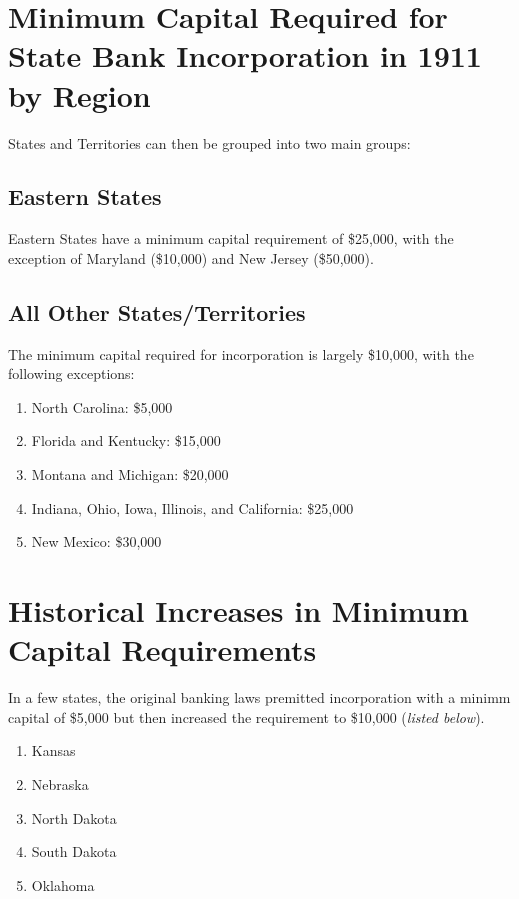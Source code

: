 ﻿\documentclass[12pt]{report}
\begin{document}
\chapter{Minimum Capital Required for State Bank Incorporation in 1911 by Region}

States and Territories can then be grouped into two main groups:\\

\section{Eastern States}
Eastern States have a minimum capital requirement of \$25,000, with the exception of Maryland (\$10,000) and New Jersey (\$50,000).

\section{All Other States/Territories}
The minimum capital required for incorporation is largely \$10,000, with the following exceptions:

\begin{enumerate}
\item North Carolina: \$5,000
\item Florida and Kentucky: \$15,000
\item Montana and Michigan: \$20,000
\item Indiana, Ohio, Iowa, Illinois, and California: \$25,000
\item New Mexico: \$30,000
\end{enumerate}



\chapter{Historical Increases in Minimum Capital Requirements}

In a few states, the original banking laws premitted incorporation with a minimm capital of \$5,000 but then increased the requirement to \$10,000 (\textit{listed below}).

\begin{enumerate}
\item Kansas
\item Nebraska
\item North Dakota
\item South Dakota
\item Oklahoma
\end{enumerate}
\end{document}
